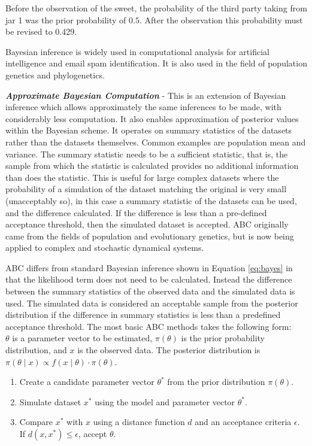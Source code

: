 Before the observation of the sweet, the probability of the third party taking from jar 1 was the prior probability of $0.5$. After the observation this probability must be revised to 0.429.

Bayesian inference is widely used in computational analysis for artificial intelligence and email spam identification. It is also used in the field of population genetics and phylogenetics\cite{Ronquist2011}.

\textbf{\textit{Approximate Bayesian Computation}} - This is an extension of Bayesian inference which allows approximately the same inferences to be made, with considerably less computation. It also enables approximation of posterior values within the Bayesian scheme. It operates on summary statistics of the datasets rather than the datasets themselves. Common examples are population mean and variance. The summary statistic needs to be a sufficient statistic, that is, the sample from which the statistic is calculated provides no additional information than does the statistic. This is useful for large complex datasets where the probability of a simulation of the dataset matching the original is very small (unacceptably so), in this case a summary statistic of the datasets can be used, and the difference calculated. If the difference is less than a pre-defined acceptance threshold, then the simulated dataset is accepted. ABC originally came from the fields of 
population and evolutionary genetics\cite{Beaumont2002}, but is now being applied to complex and stochastic dynamical systems\cite{Sisson2007,Toni2009,Beaumont2010}.

ABC differs from standard Bayesian inference shown in Equation \ref{eq:bayes} in that the likelihood term does not need to be calculated. Instead the difference between the summary statistics of the observed data and the simulated data is used. The simulated data is considered an acceptable sample from the posterior distribution if the difference in summary statistics is less than a predefined acceptance threshold.
The most basic ABC methods takes the following form:\\
$\theta$ is a parameter vector to be estimated, $\pi(\theta)$ is the prior probability distribution, and $x$ is the observed data. The posterior distribution is $\pi(\theta \mid x) \propto f(x \mid \theta)\cdot \pi(\theta)$.
\begin{enumerate}
	\item Create a candidate parameter vector $\theta^*$ from the prior distribution $\pi(\theta)$.
	\item Simulate dataset $x^*$ using the model and parameter vector $\theta^*$.
	\item Compare $x^*$ with $x$ using a distance function $d$ and an acceptance criteria $\epsilon$. If $d(x,x^*)\leq \epsilon$, accept $\theta$.
\end{enumerate}

